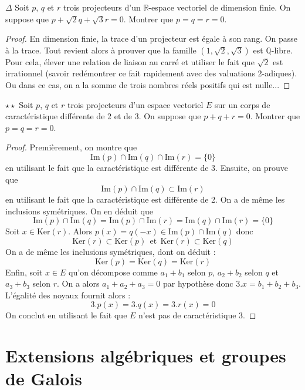\documentclass[french,a4paper]{article}
\newcommand{\Q}{\mathbb{Q}}
\newcommand{\R}{\mathbb{R}}
\renewcommand{\ker}{\text{Ker}}
\newcommand{\im}{\text{Im}}
\theoremstyle{plain}
\theoremstyle{definition}
\theoremstyle{remark}
\begin{document}
\begin{ex}[Moulin.58]{$\Delta$}
	Soit $p$, $q$ et $r$ trois projecteurs d'un $\R$-espace vectoriel de dimension finie. On suppose que $p+\sqrt{2}q+\sqrt{3}r=0$. Montrer que $p=q=r=0$.
\end{ex}
\begin{proof}
	En dimension finie, la trace d'un projecteur est égale à son rang. On passe à la trace. Tout revient alors à prouver que la famille $(1,\sqrt{2},\sqrt{3})$ est $\Q$-libre. Pour cela, élever une relation de liaison au carré et utiliser le fait que $\sqrt{2}$ est irrationnel (savoir redémontrer ce fait rapidement avec des valuations 2-adiques). Ou dans ce cas, on a la somme de trois nombres réels positifs qui est nulle...
\end{proof}

\begin{ex}[Moulin.59]{$\star\star$}
	Soit $p$, $q$ et $r$ trois projecteurs d'un espace vectoriel $E$ sur un corps de caractéristique différente de 2 et de 3. On suppose que $p+q+r=0$. Montrer que $p=q=r=0$.
\end{ex}
\begin{proof}
	Premièrement, on montre que $$\im(p)\cap\im(q)\cap\im(r)=\{0\}$$ en utilisant le fait que la caractéristique est différente de 3. Ensuite, on prouve que $$\im(p)\cap\im(q)\subset\im(r)$$ en utilisant le fait que la caractéristique est différente de 2. On a de même les inclusions symétriques. On en déduit que $$\im(p)\cap\im(q)=\im(p)\cap\im(r)=\im(q)\cap\im(r)=\{0\}$$ Soit $x\in\ker(r)$. Alors $p(x)=q(-x)\in\im(p)\cap\im(q)$ donc $$\ker(r)\subset\ker(p) \ \ \text{et} \ \ \ker(r)\subset\ker(q)$$ On a de même les inclusions symétriques, dont on déduit : $$\ker(p)=\ker(q)=\ker(r)$$ Enfin, soit $x\in E$ qu'on décompose comme $a_1+b_1$ selon $p$, $a_2+b_2$ selon $q$ et $a_3+b_3$ selon $r$. On a alors $a_1+a_2+a_3=0$ par hypothèse donc $3.x=b_1+b_2+b_3$. L'égalité des noyaux fournit alors : $$3.p(x)=3.q(x)=3.r(x)=0$$ On conclut en utilisant le fait que $E$ n'est pas de caractéristique 3.
\end{proof}

\section{Extensions algébriques et groupes de Galois}
\end{document}
